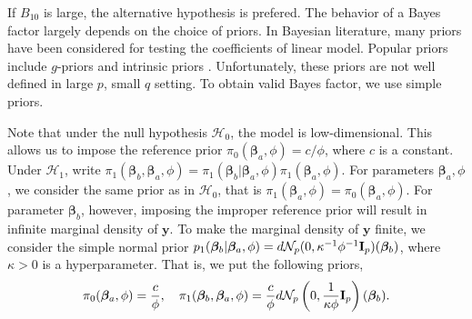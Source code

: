 \documentclass[11pt]{article}
\newcommand{\By}{\mathbf{y}}    \newcommand{\Bz}{\mathbf{z}}
\newcommand{\bfsym}[1]{\ensuremath{\boldsymbol{#1}}}
\def\bbeta{\bfsym \beta}
\theoremstyle{plain}
\theoremstyle{definition}
\theoremstyle{remark}
\begin{document}
If $B_{10}$ is large, the alternative hypothesis is prefered.
The behavior of a Bayes factor largely depends on the choice of priors.
In Bayesian literature, many priors have been considered for testing the coefficients of linear model.
Popular priors include $g$-priors \citep{Liang2008Mixtures} and intrinsic priors \citep{Casella2006Obj}.
Unfortunately, these priors are not well defined in large $p$, small $q$ setting.
To obtain valid Bayes factor, we use simple priors.

Note that under the null hypothesis $\mathcal H_0$, the model is low-dimensional.
This allows us to impose the reference prior $\pi_0 (\bbeta_a,\phi)=c/\phi$, where $c$ is a constant.
Under $\mathcal H_1$,
write $\pi_1(\bbeta_b,\bbeta_a,\phi)=\pi_1(\bbeta_b|\bbeta_a,\phi) \pi_1(\bbeta_a,\phi)$.
For parameters $\bbeta_a,\phi$, we consider the same prior as in $\mathcal H_0$, that is $\pi_1(\bbeta_a,\phi)=\pi_0(\bbeta_a,\phi)$.
For parameter $\bbeta_b$, however, imposing the improper reference prior will result in infinite marginal density of $\By$.
To make the marginal density of $\By$ finite,
we consider the simple normal prior $p_1(\bbeta_b|\bbeta_a, \phi) = d \mathcal N_{p} (0, \kappa^{-1} \phi^{-1} \BI_{p}) (\bbeta_b) $, where $\kappa>0$ is a hyperparameter.
That is, we put the following priors,
\begin{equation}\label{priors}
    \pi_0(\bbeta_a,\phi)= \frac{c}{\phi},\quad
    \pi_1(\bbeta_b,\bbeta_a,\phi)=\frac{c}{\phi} d \mathcal N_{p} \left(0, \frac{1}{\kappa \phi} \BI_{p}\right) (\bbeta_b).
\end{equation}
\end{document}
